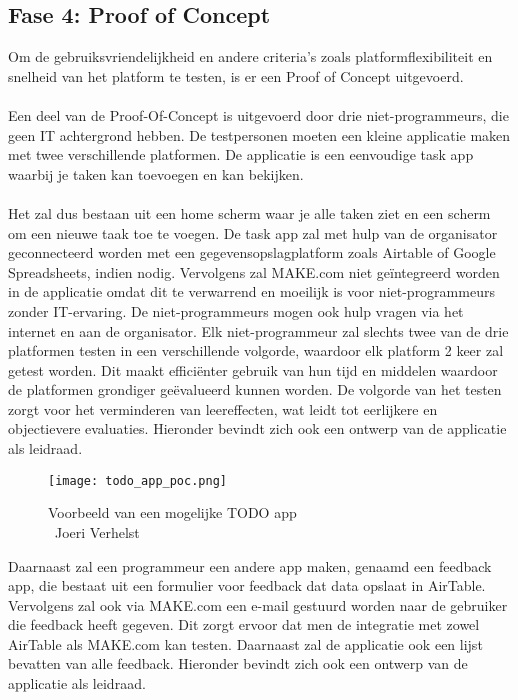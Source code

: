 \subsection*{Fase 4: Proof of Concept}%
\label{sec:proof-of-concept}
Om de gebruiksvriendelijkheid en andere criteria's zoals platformflexibiliteit en snelheid van het platform te testen, is er een Proof of Concept uitgevoerd. 
\\
\\
Een deel van de Proof-Of-Concept is uitgevoerd door drie niet-programmeurs, die geen IT achtergrond hebben. De testpersonen moeten
een kleine applicatie maken met twee verschillende platformen. De applicatie is een eenvoudige task app waarbij je taken kan toevoegen en kan bekijken.
\\
\\
Het zal dus bestaan uit een home scherm waar je alle taken ziet en een scherm om een nieuwe taak toe te voegen. De task app zal met hulp van de organisator geconnecteerd worden met een gegevensopslagplatform zoals Airtable of Google Spreadsheets, indien nodig. 
Vervolgens zal MAKE.com niet geïntegreerd worden in de applicatie omdat dit te verwarrend en moeilijk is voor niet-programmeurs zonder IT-ervaring.
De niet-programmeurs mogen ook hulp vragen via het internet en aan de organisator.
Elk niet-programmeur zal slechts twee van de drie platformen testen in een verschillende volgorde, waardoor elk platform 2 keer zal getest worden. Dit maakt efficiënter gebruik van hun tijd en middelen waardoor de platformen grondiger geëvalueerd kunnen worden. De volgorde van het testen zorgt voor het verminderen van leereffecten, wat leidt tot eerlijkere en objectievere evaluaties.
Hieronder bevindt zich ook een ontwerp van de applicatie als leidraad.
\\
\begin{figure}[H]
    \centering
    \texttt{[image: todo\_app\_poc.png]}
    \caption[Voorbeeld van een mogelijke TODO app]{Voorbeeld van een mogelijke TODO app\\\textcopyright\ Joeri Verhelst}
    \label{fig:todo_app}
\end{figure}

Daarnaast zal een programmeur een andere app maken, genaamd een feedback app, die bestaat uit een formulier voor feedback dat data opslaat in AirTable.
Vervolgens zal ook via MAKE.com een e-mail gestuurd worden naar de gebruiker die feedback heeft gegeven.
Dit zorgt ervoor dat men de integratie met zowel AirTable als MAKE.com kan testen. Daarnaast zal de applicatie ook een lijst bevatten van alle feedback.
Hieronder bevindt zich ook een ontwerp van de applicatie als leidraad.

